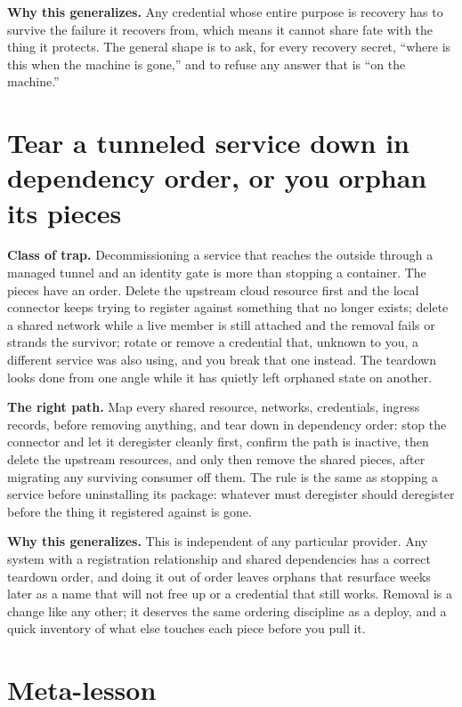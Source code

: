\documentclass[12pt]{article}
\begin{document}
\textbf{Why this generalizes.} Any credential whose entire purpose is recovery has to survive the failure it recovers from, which means it cannot share fate with the thing it protects. The general shape is to ask, for every recovery secret, ``where is this when the machine is gone,'' and to refuse any answer that is ``on the machine.''

\section{Tear a tunneled service down in dependency order, or you orphan its pieces}

\textbf{Class of trap.} Decommissioning a service that reaches the outside through a managed tunnel and an identity gate is more than stopping a container. The pieces have an order. Delete the upstream cloud resource first and the local connector keeps trying to register against something that no longer exists; delete a shared network while a live member is still attached and the removal fails or strands the survivor; rotate or remove a credential that, unknown to you, a different service was also using, and you break that one instead. The teardown looks done from one angle while it has quietly left orphaned state on another.

\textbf{The right path.} Map every shared resource, networks, credentials, ingress records, before removing anything, and tear down in dependency order: stop the connector and let it deregister cleanly first, confirm the path is inactive, then delete the upstream resources, and only then remove the shared pieces, after migrating any surviving consumer off them. The rule is the same as stopping a service before uninstalling its package: whatever must deregister should deregister before the thing it registered against is gone.

\textbf{Why this generalizes.} This is independent of any particular provider. Any system with a registration relationship and shared dependencies has a correct teardown order, and doing it out of order leaves orphans that resurface weeks later as a name that will not free up or a credential that still works. Removal is a change like any other; it deserves the same ordering discipline as a deploy, and a quick inventory of what else touches each piece before you pull it.

\section{Meta-lesson}
\end{document}
